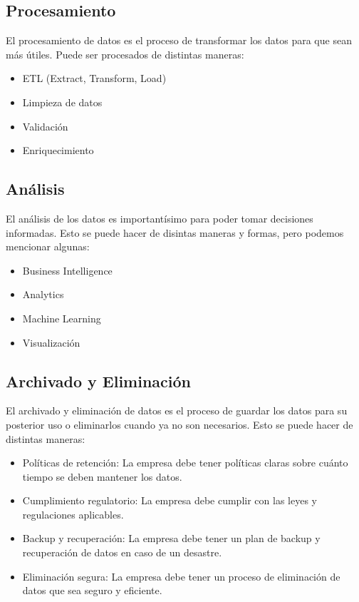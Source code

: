 \documentclass[12pt]{article}
\begin{document}
\subsection{Procesamiento}
El procesamiento de datos es el proceso de transformar los datos para que sean más útiles. Puede ser procesados de distintas maneras:
\begin{itemize}
    \item ETL (Extract, Transform, Load)
    \item Limpieza de datos
    \item Validación
    \item Enriquecimiento
\end{itemize}

\subsection{Análisis}
El análisis de los datos es importantísimo para poder tomar decisiones informadas. Esto se puede hacer de disintas maneras y formas, pero podemos mencionar algunas:
\begin{itemize}
    \item Business Intelligence
    \item Analytics
    \item Machine Learning
    \item Visualización
\end{itemize}

\subsection{Archivado y Eliminación}
El archivado y eliminación de datos es el proceso de guardar los datos para su posterior uso o eliminarlos cuando ya no son necesarios. Esto se puede hacer de distintas maneras:
\begin{itemize}
    \item Políticas de retención: La empresa debe tener políticas claras sobre cuánto tiempo se deben mantener los datos.
    \item Cumplimiento regulatorio: La empresa debe cumplir con las leyes y regulaciones aplicables.
    \item Backup y recuperación: La empresa debe tener un plan de backup y recuperación de datos en caso de un desastre.
    \item Eliminación segura: La empresa debe tener un proceso de eliminación de datos que sea seguro y eficiente.
\end{itemize}
\end{document}
